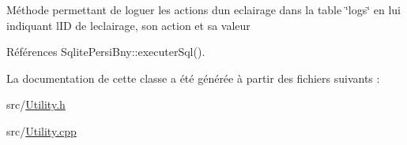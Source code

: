 Méthode permettant de loguer les actions d\textquotesingle{}un eclairage dans la table \char`\"{}logs\char`\"{} en lui indiquant l\textquotesingle{}ID de l\textquotesingle{}eclairage, son action et sa valeur 

Références Sqlite\+Persi\+Bny\+::executer\+Sql().



La documentation de cette classe a été générée à partir des fichiers suivants \+:\begin{DoxyCompactItemize}
\item 
src/\hyperlink{Utility_8h}{Utility.\+h}\item 
src/\hyperlink{Utility_8cpp}{Utility.\+cpp}\end{DoxyCompactItemize}
